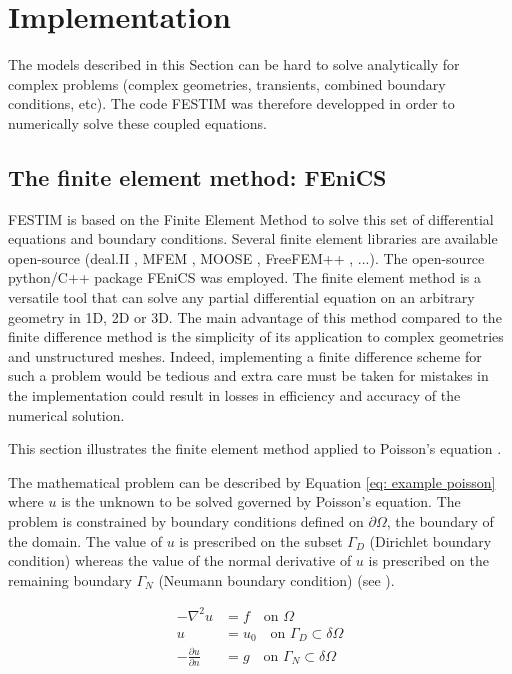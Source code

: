 \section{Implementation}


The models described in this Section can be hard to solve analytically for complex problems (complex geometries, transients, combined boundary conditions, etc).
The code FESTIM  was therefore developped in order to numerically solve these coupled equations.

\subsection{The finite element method: FEniCS}
FESTIM is based on the Finite Element Method to solve this set of differential equations and boundary conditions.
Several finite element libraries are available open-source (deal.II , MFEM , MOOSE , FreeFEM++ , ...).
The open-source python/C++ package FEniCS  was employed.
The finite element method is a versatile tool that can solve any partial differential equation on an arbitrary geometry in 1D, 2D or 3D.
The main advantage of this method compared to the finite difference method is the simplicity of its application to complex geometries and unstructured meshes.
Indeed, implementing a finite difference scheme for such a problem would be tedious and extra care must be taken for mistakes in the implementation could result in losses in efficiency and accuracy of the numerical solution.

This section illustrates the finite element method applied to Poisson's equation .

The mathematical problem can be described by Equation \ref{eq: example poisson} where $u$ is the unknown to be solved governed by Poisson's equation.
The problem is constrained by boundary conditions defined on $\partial \Omega$, the boundary of the domain.
The value of $u$ is prescribed on the subset $\Gamma_D$ (Dirichlet boundary condition) whereas the value of the normal derivative of $u$ is prescribed on the remaining boundary $\Gamma_N$ (Neumann boundary condition) (see ).

\begin{subequations}
    \begin{align}
        -\nabla^2 u &= f \quad \text{on    } \Omega \\
        u &= u_0 \quad \text{on    } \Gamma_D  \subset \delta \Omega \\
        -\frac{\partial u}{\partial n} &= g \quad \text{on    } \Gamma_N  \subset \delta \Omega
    \end{align}
    \label{eq: example poisson}
\end{subequations}


